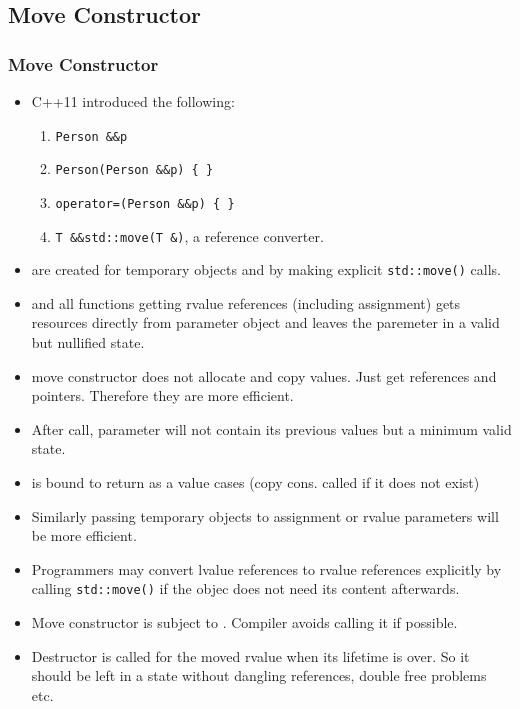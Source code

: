 \subsection{Move Constructor}
\begin{frame}
\frametitle{Move Constructor}
\begin{itemize}
\item C++11 introduced the following:
\begin{enumerate}
\item {} \lstinline!Person &&p!
\item {} \lstinline!Person(Person &&p) { }!
\item {} \lstinline!operator=(Person &&p) { }!
\item \lstinline!T &&std::move(T &)!, a reference converter.
\end{enumerate}
\item {} are created for temporary objects and by making explicit \lstinline!std::move()! calls.
\item {} and all functions getting rvalue references (including assignment) gets resources directly from parameter object and leaves the paremeter in a valid but nullified state.
\item move constructor does not allocate and copy values. Just get references and pointers. Therefore they are more efficient.
\item After call, parameter will not contain its previous values but a minimum valid state.
\end{itemize}
\end{frame}

\begin{frame}
\begin{itemize}
\item {} is bound to return as a value cases (copy cons. called if it does not exist)
\item Similarly passing temporary objects  to assignment or rvalue parameters will be more efficient.
\item Programmers may convert lvalue references to rvalue references explicitly by calling \lstinline!std::move()! if the objec does not need its content afterwards.
\item Move constructor is subject to . Compiler avoids calling it if possible.
\item Destructor is called for the moved rvalue when its lifetime is over. So it should be left 
in a state without dangling references, double free problems etc.
\end{itemize}
\end{frame}

